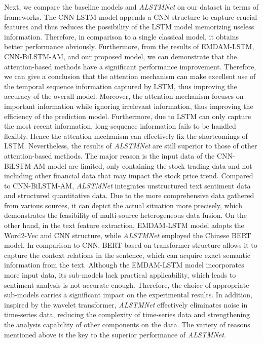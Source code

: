 \documentclass[sn-mathphys]{sn-jnl}%
\theoremstyle{thmstyleone}%
\theoremstyle{thmstyletwo}%
\theoremstyle{thmstylethree}%
\begin{document}
Next, we compare the baseline models and {\it ALSTMNet} on our dataset in terms of frameworks. The CNN-LSTM model appends a CNN structure to capture crucial features and thus reduces the possibility of the LSTM model memorizing useless information. Therefore, in comparison to a single classical model, it obtains better performance obviously. Furthermore, from the results of EMDAM-LSTM, CNN-BiLSTM-AM, and our proposed model, we can demonstrate that the attention-based methods have a significant performance improvement. Therefore, we can give a conclusion that the attention mechanism can make excellent use of the temporal sequence information captured by LSTM, thus improving the accuracy of the overall model. Moreover, the attention mechanism focuses on important information while ignoring irrelevant information, thus improving the efficiency of the prediction model. Furthermore, due to LSTM can only capture the most recent information, long-sequence information fails to be handled flexibly. Hence the attention mechanism can effectively fix the shortcomings of LSTM. Nevertheless, the results of {\it ALSTMNet} are still superior to those of other attention-based methods. The major reason is the input data of the CNN-BiLSTM-AM model are limited, only containing the stock trading data and not including other financial data that may impact the stock price trend. Compared to CNN-BiLSTM-AM, {\it ALSTMNet} integrates unstructured text sentiment data and structured quantitative data. Due to the more comprehensive data gathered from various sources, it can depict the actual situation more precisely, which demonstrates the feasibility of multi-source heterogeneous data fusion. On the other hand, in the text feature extraction, EMDAM-LSTM model adopts the Word2-Vec and CNN structure, while {\it ALSTMNet} employed the Chinese BERT model. In comparison to CNN, BERT based on transformer structure allows it to capture the context relations in the sentence, which can acquire exact semantic information from the text. Although the EMDAM-LSTM model incorporates more input data, its sub-models lack practical applicability, which leads to sentiment analysis is not accurate enough. Therefore, the choice of appropriate sub-models carries a significant impact on the experimental results. In addition, inspired by the wavelet transformer,  {\it ALSTMNet} effectively eliminates noise in time-series data, reducing the complexity of time-series data and strengthening the analysis capability of other components on the data. The variety of reasons mentioned above is the key to the superior performance of {\it ALSTMNet}.
\end{document}
